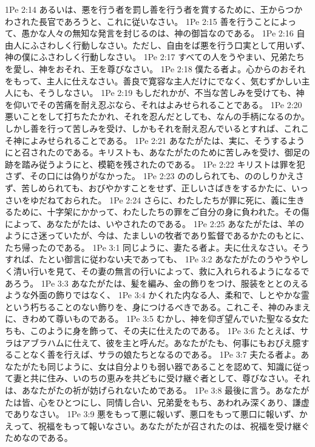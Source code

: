 1Pe 2:14  あるいは、悪を行う者を罰し善を行う者を賞するために、王からつかわされた長官であろうと、これに従いなさい。
1Pe 2:15  善を行うことによって、愚かな人々の無知な発言を封じるのは、神の御旨なのである。
1Pe 2:16  自由人にふさわしく行動しなさい。ただし、自由をば悪を行う口実として用いず、神の僕にふさわしく行動しなさい。
1Pe 2:17  すべての人をうやまい、兄弟たちを愛し、神をおそれ、王を尊びなさい。
1Pe 2:18  僕たる者よ。心からのおそれをもって、主人に仕えなさい。善良で寛容な主人だけにでなく、気むずかしい主人にも、そうしなさい。
1Pe 2:19  もしだれかが、不当な苦しみを受けても、神を仰いでその苦痛を耐え忍ぶなら、それはよみせられることである。
1Pe 2:20  悪いことをして打ちたたかれ、それを忍んだとしても、なんの手柄になるのか。しかし善を行って苦しみを受け、しかもそれを耐え忍んでいるとすれば、これこそ神によみせられることである。
1Pe 2:21  あなたがたは、実に、そうするようにと召されたのである。キリストも、あなたがたのために苦しみを受け、御足の跡を踏み従うようにと、模範を残されたのである。
1Pe 2:22  キリストは罪を犯さず、その口には偽りがなかった。
1Pe 2:23  ののしられても、ののしりかえさず、苦しめられても、おびやかすことをせず、正しいさばきをするかたに、いっさいをゆだねておられた。
1Pe 2:24  さらに、わたしたちが罪に死に、義に生きるために、十字架にかかって、わたしたちの罪をご自分の身に負われた。その傷によって、あなたがたは、いやされたのである。
1Pe 2:25  あなたがたは、羊のようにさ迷っていたが、今は、たましいの牧者であり監督であるかたのもとに、たち帰ったのである。
1Pe 3:1  同じように、妻たる者よ。夫に仕えなさい。そうすれば、たとい御言に従わない夫であっても、
1Pe 3:2  あなたがたのうやうやしく清い行いを見て、その妻の無言の行いによって、救に入れられるようになるであろう。
1Pe 3:3  あなたがたは、髪を編み、金の飾りをつけ、服装をととのえるような外面の飾りではなく、
1Pe 3:4  かくれた内なる人、柔和で、しとやかな霊という朽ちることのない飾りを、身につけるべきである。これこそ、神のみまえに、きわめて尊いものである。
1Pe 3:5  むかし、神を仰ぎ望んでいた聖なる女たちも、このように身を飾って、その夫に仕えたのである。
1Pe 3:6  たとえば、サラはアブラハムに仕えて、彼を主と呼んだ。あなたがたも、何事にもおびえ臆することなく善を行えば、サラの娘たちとなるのである。
1Pe 3:7  夫たる者よ。あなたがたも同じように、女は自分よりも弱い器であることを認めて、知識に従って妻と共に住み、いのちの恵みを共どもに受け継ぐ者として、尊びなさい。それは、あなたがたの祈が妨げられないためである。
1Pe 3:8  最後に言う。あなたがたは皆、心をひとつにし、同情し合い、兄弟愛をもち、あわれみ深くあり、謙虚でありなさい。
1Pe 3:9  悪をもって悪に報いず、悪口をもって悪口に報いず、かえって、祝福をもって報いなさい。あなたがたが召されたのは、祝福を受け継ぐためなのである。
